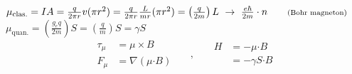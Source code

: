 \documentclass[12pt]{article}
\newcommand{\dotP}{\boldsymbol \cdot}		%
\begin{document}
\vspace{10pt} \noindent
\(
    \mu_\text{clas.} = IA = \frac{q}{2 \pi r} v (\pi r^2) 
    = \frac{q}{2 \pi r} \frac{L}{m r} (\pi r^2) 
    = \left( \frac{q}{2m} \right) L 
    \ \rightarrow \ \frac{e\hbar}{2m} \cdot n 
    \hspace{20pt} \text{\scriptsize(Bohr magneton)}
\)\\[10pt]
\(
    \mu_\text{quan.} = \left( \frac{g_e q}{2m} \right) S = \left( \frac{q}{m} \right) S = \gamma S
\)
\[
    \begin{aligned}
        \tau_\mu &= \mu \times B \\[5pt]
        F_\mu &= \nabla(\mu \dotP B)
    \end{aligned}
    \hspace{18pt} , \hspace{18pt}\begin{aligned}
        H &= -\mu \dotP B \\[5pt]
        &= - \gamma S \dotP B
    \end{aligned}
\]
\end{document}
